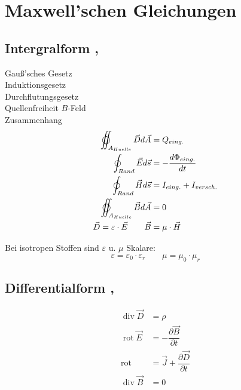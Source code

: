 \section{Maxwell’schen Gleichungen}

\subsection{Intergralform , }
Gauß'sches Gesetz\\
Induktionsgesetz\\
Durchflutungsgesetz\\
Quellenfreiheit $B$-Feld\\
Zusammenhang
\begin{align*}
    \varoiint_{A_{Huelle}} \vec{D} d \vec{A} &= Q_{eing.}\\
    \oint_{Rand} \vec{E} d \vec{s} &= -\dfrac{d\Phi_{eing.}}{dt}\\
    \oint_{Rand} \vec{H} d \vec{s} &= I_{eing.} + I_{versch.} \\
    \varoiint_{A_{Huelle}} \vec{B} d \vec{A} &= 0\\
    \vec{D} = \varepsilon \cdot \vec{E} \qquad 
            \vec{B} &= \mu \cdot \vec{H}
\end{align*}

Bei isotropen Stoffen sind $\varepsilon$ u. $\mu$ Skalare:
\begin{equation*}
    \varepsilon = \varepsilon_0 \cdot \varepsilon_r \qquad \mu = \mu_0 \cdot \mu_r
\end{equation*}

\subsection{Differentialform , }
\begin{align*}
    \operatorname{div} \vec{D} &= \rho\\
    \operatorname{rot} \vec{E} &= -\dfrac{\partial \vec{B}}{\partial t}\\
    \operatorname{rot} &= \vec{J} + \dfrac{\partial \vec{D}}{\partial t} \\
    \operatorname{div} \vec{B} &= 0
\end{align*}


